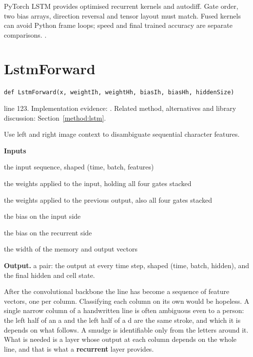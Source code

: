 PyTorch LSTM provides optimised recurrent kernels and autodiff. Gate order, two bias arrays, direction reversal and tensor layout must match. Fused kernels can avoid Python frame loops; speed and final trained accuracy are separate comparisons. \cite{hochreiter1997,torchlstm,gravesbook}.


\section{LstmForward}\label{fn:recognise:LstmForward}
\begin{lstlisting}[style=sig]
def LstmForward(x, weightIh, weightHh, biasIh, biasHh, hiddenSize)
\end{lstlisting}
 line 123. Implementation evidence: \cite{code2026}. Related method, alternatives and library discussion: Section~\ref{method:lstm}.


Use left and right image context to disambiguate sequential character features.




\noindent\textbf{Inputs}
\begin{description}[leftmargin=2.2em,style=nextline,font=\normalfont\ttfamily]\setlength\itemsep{1pt}
  \item[{x}] \normalfont the input sequence, shaped (time, batch, features)
  \item[{weightIh}] \normalfont the weights applied to the input, holding all four gates stacked
  \item[{weightHh}] \normalfont the weights applied to the previous output, also all four gates stacked
  \item[{biasIh}] \normalfont the bias on the input side
  \item[{biasHh}] \normalfont the bias on the recurrent side
  \item[{hiddenSize}] \normalfont the width of the memory and output vectors
\end{description}

\noindent\textbf{Output.} a pair: the output at every time step, shaped (time, batch, hidden), and the final hidden and cell state.


After the convolutional backbone the line has become a sequence of feature vectors, one per column. Classifying each column on its own would be hopeless. A single narrow column of a handwritten line is often ambiguous even to a person: the left half of an a and the left half of a d are the same stroke, and which it is depends on what follows. A smudge is identifiable only from the letters around it. What is needed is a layer whose output at each column depends on the whole line, and that is what a \textbf{recurrent} layer provides.


